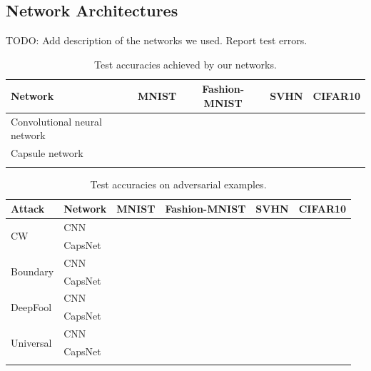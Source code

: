 \documentclass{article}
\begin{document}
\subsection{Network Architectures}
TODO: Add description of the networks we used. Report test errors.

\begin{table}[h]
	\centering
	\begin{tabular}{lcccc}
		\toprule
		Network       & MNIST & Fashion-MNIST & SVHN & CIFAR10  \\
		\midrule
		Convolutional neural network &  &  &  &  \\
		Capsule network            &  &  &  &  \\
		\bottomrule\\
	\end{tabular}
	\label{tab:accuracies}
	\caption{Test accuracies achieved by our networks.}
\end{table}

\begin{table}[h]
	\centering
	\begin{tabular}{llcccc}
		\toprule
		Attack & Network       & MNIST & Fashion-MNIST & SVHN & CIFAR10  \\
		\midrule
		\multirow{2}{*}{CW} & CNN &  &  &  &  \\
		& CapsNet            &  &  &  &  \\
		\midrule
		\multirow{2}{*}{Boundary} & CNN &  &  &  &  \\
		& CapsNet            &  &  &  &  \\
		\midrule
		\multirow{2}{*}{DeepFool} & CNN &  &  &  &  \\
		& CapsNet           &  &  &  &  \\
		\midrule
		\multirow{2}{*}{Universal} & CNN &  &  &  &  \\
		& CapsNet           &  &  &  &  \\
		\bottomrule\\
	\end{tabular}
	\label{tab:attacks}
	\caption{Test accuracies on adversarial examples.}
\end{table}
\end{document}
